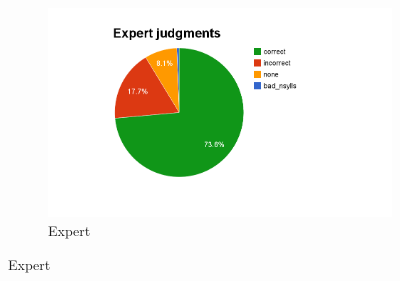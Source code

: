 			
			\begin{figure}[htb]
				\centering
				\begin{subfigure}[b]{.5\textwidth}
					\centering
					\includegraphics[width=\textwidth]{img/annotation/expertPie}
					\caption{Expert}
					\label{fig:expertisepies:expert}
				\end{subfigure}%
				

\end{figure}
